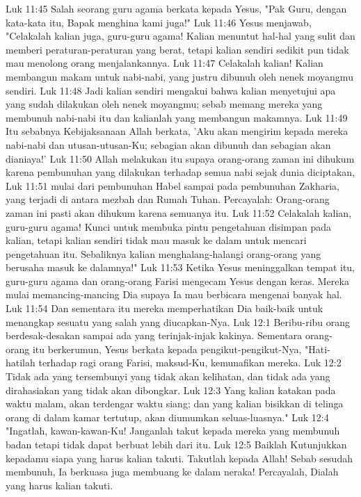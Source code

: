 Luk 11:45  Salah seorang guru agama berkata kepada Yesus, "Pak Guru, dengan kata-kata itu, Bapak menghina kami juga!"
Luk 11:46  Yesus menjawab, "Celakalah kalian juga, guru-guru agama! Kalian menuntut hal-hal yang sulit dan memberi peraturan-peraturan yang berat, tetapi kalian sendiri sedikit pun tidak mau menolong orang menjalankannya.
Luk 11:47  Celakalah kalian! Kalian membangun makam untuk nabi-nabi, yang justru dibunuh oleh nenek moyangmu sendiri.
Luk 11:48  Jadi kalian sendiri mengakui bahwa kalian menyetujui apa yang sudah dilakukan oleh nenek moyangmu; sebab memang mereka yang membunuh nabi-nabi itu dan kalianlah yang membangun makamnya.
Luk 11:49  Itu sebabnya Kebijaksanaan Allah berkata, 'Aku akan mengirim kepada mereka nabi-nabi dan utusan-utusan-Ku; sebagian akan dibunuh dan sebagian akan dianiaya!'
Luk 11:50  Allah melakukan itu supaya orang-orang zaman ini dihukum karena pembunuhan yang dilakukan terhadap semua nabi sejak dunia diciptakan,
Luk 11:51  mulai dari pembunuhan Habel sampai pada pembunuhan Zakharia, yang terjadi di antara mezbah dan Rumah Tuhan. Percayalah: Orang-orang zaman ini pasti akan dihukum karena semuanya itu.
Luk 11:52  Celakalah kalian, guru-guru agama! Kunci untuk membuka pintu pengetahuan disimpan pada kalian, tetapi kalian sendiri tidak mau masuk ke dalam untuk mencari pengetahuan itu. Sebaliknya kalian menghalang-halangi orang-orang yang berusaha masuk ke dalamnya!"
Luk 11:53  Ketika Yesus meninggalkan tempat itu, guru-guru agama dan orang-orang Farisi mengecam Yesus dengan keras. Mereka mulai memancing-mancing Dia supaya Ia mau berbicara mengenai banyak hal.
Luk 11:54  Dan sementara itu mereka memperhatikan Dia baik-baik untuk menangkap sesuatu yang salah yang diucapkan-Nya.
Luk 12:1  Beribu-ribu orang berdesak-desakan sampai ada yang terinjak-injak kakinya. Sementara orang-orang itu berkerumun, Yesus berkata kepada pengikut-pengikut-Nya, "Hati-hatilah terhadap ragi orang Farisi, maksud-Ku, kemunafikan mereka.
Luk 12:2  Tidak ada yang tersembunyi yang tidak akan kelihatan, dan tidak ada yang dirahasiakan yang tidak akan dibongkar.
Luk 12:3  Yang kalian katakan pada waktu malam, akan terdengar waktu siang; dan yang kalian bisikkan di telinga orang di dalam kamar tertutup, akan diumumkan seluas-luasnya."
Luk 12:4  "Ingatlah, kawan-kawan-Ku! Janganlah takut kepada mereka yang membunuh badan tetapi tidak dapat berbuat lebih dari itu.
Luk 12:5  Baiklah Kutunjukkan kepadamu siapa yang harus kalian takuti. Takutlah kepada Allah! Sebab sesudah membunuh, Ia berkuasa juga membuang ke dalam neraka! Percayalah, Dialah yang harus kalian takuti.
